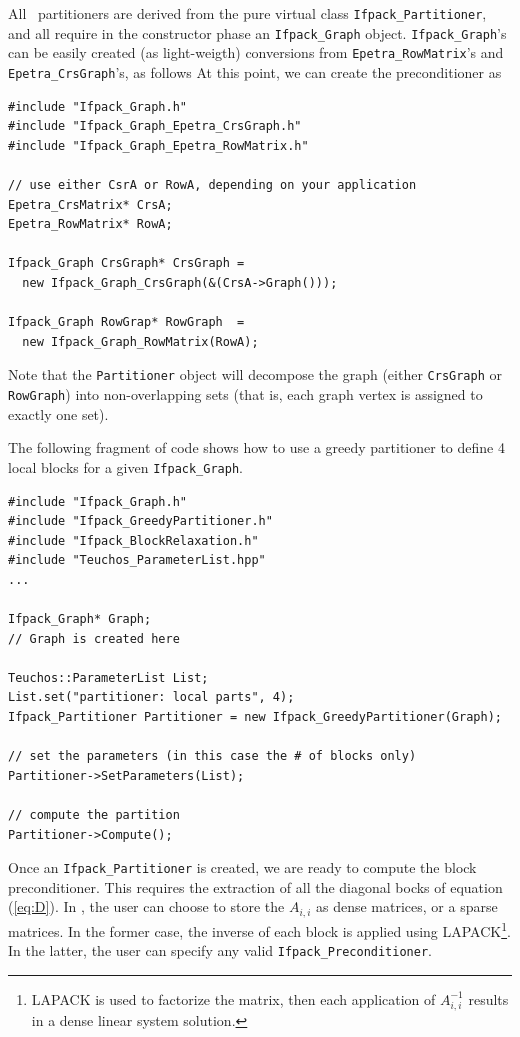 All \ifpack\ partitioners are derived from the pure virtual class
\verb!Ifpack_Partitioner!, and all require in the constructor phase
an \verb!Ifpack_Graph! object. \verb!Ifpack_Graph!'s can be easily
created (as light-weigth) conversions from \verb!Epetra_RowMatrix!'s
and \verb!Epetra_CrsGraph!'s, as follows At this point, we can create the
preconditioner as
\begin{verbatim}
#include "Ifpack_Graph.h"
#include "Ifpack_Graph_Epetra_CrsGraph.h"
#include "Ifpack_Graph_Epetra_RowMatrix.h"

// use either CsrA or RowA, depending on your application
Epetra_CrsMatrix* CrsA;
Epetra_RowMatrix* RowA;

Ifpack_Graph CrsGraph* CrsGraph =
  new Ifpack_Graph_CrsGraph(&(CrsA->Graph()));

Ifpack_Graph RowGrap* RowGraph  =
  new Ifpack_Graph_RowMatrix(RowA);
\end{verbatim}
Note that the \verb!Partitioner! object will decompose the graph (either
\verb!CrsGraph! or \verb!RowGraph!) into
non-overlapping sets (that is, each graph vertex is assigned to exactly one
set).

The following fragment of code shows how to use a greedy partitioner to define
4 local blocks for a given \verb!Ifpack_Graph!.

\begin{verbatim}
#include "Ifpack_Graph.h"
#include "Ifpack_GreedyPartitioner.h"
#include "Ifpack_BlockRelaxation.h"
#include "Teuchos_ParameterList.hpp"
...

Ifpack_Graph* Graph;   
// Graph is created here

Teuchos::ParameterList List;
List.set("partitioner: local parts", 4);
Ifpack_Partitioner Partitioner = new Ifpack_GreedyPartitioner(Graph);

// set the parameters (in this case the # of blocks only)
Partitioner->SetParameters(List);

// compute the partition
Partitioner->Compute();
\end{verbatim}

Once an \verb!Ifpack_Partitioner! is created, we are ready to
compute the block preconditioner. This requires the extraction of
all the diagonal bocks of equation (\ref{eq:D}). In \ifpack, the
user can choose to store the $A_{i,i}$ as dense matrices, or a sparse
matrices. In the former case, the inverse of each block is applied using
LAPACK\footnote{LAPACK is used to factorize the matrix, then each application
  of $A_{i,i}^{-1}$ results in a dense linear system solution.}. In the
  latter, the user can specify any valid \verb!Ifpack_Preconditioner!.

